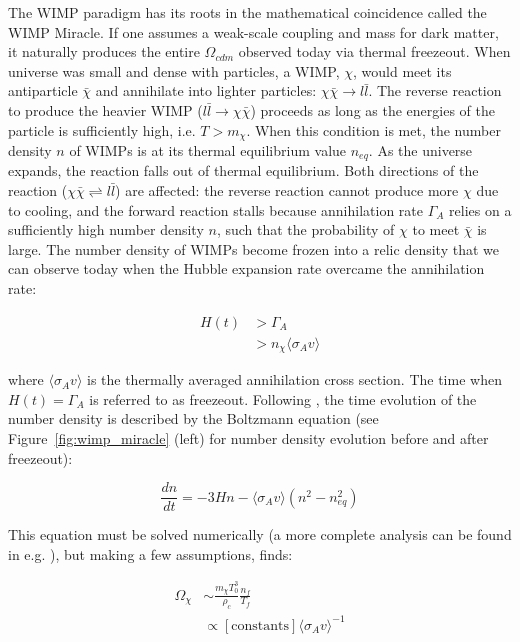 The \ac{WIMP} paradigm has its roots in the mathematical coincidence called the \ac{WIMP} Miracle. If one assumes a weak-scale coupling and mass for dark matter, it naturally produces the entire $\Omega_{cdm}$ observed today via thermal freezeout. When universe was small and dense with particles, a \ac{WIMP}, $\chi$, would meet its antiparticle $\bar{\chi}$ and annihilate into lighter particles: $\chi \bar{\chi} \rightarrow l \bar{l}$. The reverse reaction to produce the heavier \ac{WIMP} ($ l \bar{l} \rightarrow \chi \bar{\chi} $) proceeds as long as the energies of the particle is sufficiently high, i.e. $T > m_{\chi}$. When this condition is met, the number density $n$ of \ac{WIMP}s is at its thermal equilibrium value $n_{eq}$. As the universe expands, the reaction falls out of thermal equilibrium. Both directions of the reaction ($\chi \bar{\chi} \rightleftharpoons l \bar{l}$) are affected: the reverse reaction cannot produce more $\chi$ due to cooling, and the forward reaction stalls because annihilation rate $\Gamma_{A}$ relies on a sufficiently high number density $n$, such that the probability of $\chi$ to meet $\bar{\chi}$ is large. The number density of \ac{WIMP}s become frozen into a relic density that we can observe today when the Hubble expansion rate overcame the annihilation rate:

\begin{equation}
\begin{split}
H(t) &> \Gamma_{A} \\
 &> n_{\chi} \langle \sigma_{A} v \rangle
\end{split}
\end{equation}

where $\langle \sigma_{A} v \rangle$ is the thermally averaged annihilation cross section. The time when $H(t) = \Gamma_{A}$ is referred to as freezeout. Following \cite{Feng2010}, the time evolution of the number density is described by the Boltzmann equation (see Figure~\ref{fig:wimp_miracle} (left) for number density evolution before and after freezeout):

\begin{equation}
\frac{dn}{dt} = -3 H n - \langle \sigma_{A}v \rangle (n^{2} - n_{eq}^{2} )
\end{equation}

This equation must be solved numerically (a more complete analysis can be found in e.g. \cite{Lisanti2016}), but making a few assumptions, \cite{Feng2010} finds:

\begin{equation}
\begin{split}
\Omega_{\chi} &\sim \frac{m_{\chi} T_{0}^{3}}{ \rho_{c}} \frac{n_{f}}{T_{f}} \\ %
&\propto [\mathrm{constants}] \langle \sigma_{A}v \rangle^{-1} 
\end{split}
\end{equation}

